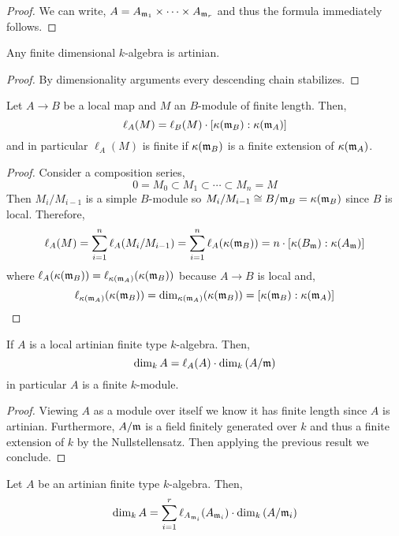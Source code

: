 \documentclass[12pt]{article}
\begin{document}
\begin{proof}
We can write, $A = A_{\mathfrak{m}_1} \times \cdots \times A_{\mathfrak{m}_r}$ and thus the formula immediately follows.
\end{proof}


\begin{prop}
Any finite dimensional $k$-algebra is artinian.
\end{prop}

\begin{proof}
By dimensionality arguments every descending chain stabilizes. 
\end{proof}

\begin{prop}
Let $A \to B$ be a local map and $M$ an $B$-module of finite length. Then,
\[ \ell_A(M) = \ell_B(M) \cdot [ \kappa(\mathfrak{m}_B) : \kappa(\mathfrak{m}_A) ] \]
and in particular $\ell_A(M)$ is finite if $\kappa(\mathfrak{m}_B)$ is a finite extension of $\kappa(\mathfrak{m}_A)$.
\end{prop}

\begin{proof}
Consider a composition series,
\[ 0 = M_0 \subset M_{1} \subset \cdots \subset M_n = M \]
Then $M_i / M_{i - 1}$ is a simple $B$-module so $M_i / M_{i-1} \cong B / \mathfrak{m}_B = \kappa(\mathfrak{m}_B)$ since $B$ is local. Therefore,
\[ \ell_A(M) = \sum_{i = 1}^n \ell_A (M_i / M_{i-1}) = \sum_{i = 1}^n \ell_A(\kappa(\mathfrak{m}_B)) = n \cdot [ \kappa(B_{\mathfrak{m}}) : \kappa(A_{\mathfrak{m}}) ] \]
where $\ell_A(\kappa(\mathfrak{m}_B)) = \ell_{\kappa(\mathfrak{m}_A)}(\kappa(\mathfrak{m}_B))$ because $A \to B$ is local and,
\[ \ell_{\kappa(\mathfrak{m}_A)}(\kappa(\mathfrak{m}_B)) = \dim_{\kappa(\mathfrak{m}_A)}(\kappa(\mathfrak{m}_B)) = [\kappa(\mathfrak{m}_B) : \kappa(\mathfrak{m}_A)] \]
\end{proof}

\begin{cor}
If $A$ is a local artinian finite type $k$-algebra. Then,
\[ \dim_k{A} = \ell_A(A) \cdot \dim_k{(A / \mathfrak{m})} \]
in particular $A$ is a finite $k$-module. 
\end{cor}

\begin{proof}
Viewing $A$ as a module over itself we know it has finite length since $A$ is artinian. Furthermore, $A / \mathfrak{m}$ is a field finitely generated over $k$ and thus a finite extension of $k$ by the Nullstellensatz. Then applying the previous result we conclude. 
\end{proof}

\begin{cor}
Let $A$ be an artinian finite type $k$-algebra. Then,
\[ \dim_k{A} = \sum_{i = 1}^r \ell_{A_{\mathfrak{m}_i}}(A_{\mathfrak{m}_i}) \cdot \dim_k{(A / \mathfrak{m}_i)} \]
\end{cor}
\end{document}
